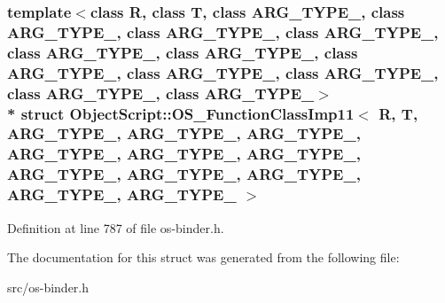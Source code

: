 \subsubsection*{template$<$class R, class T, class A\+R\+G\+\_\+\+T\+Y\+P\+E\+\_, class A\+R\+G\+\_\+\+T\+Y\+P\+E\+\_, class A\+R\+G\+\_\+\+T\+Y\+P\+E\+\_, class A\+R\+G\+\_\+\+T\+Y\+P\+E\+\_, class A\+R\+G\+\_\+\+T\+Y\+P\+E\+\_, class A\+R\+G\+\_\+\+T\+Y\+P\+E\+\_, class A\+R\+G\+\_\+\+T\+Y\+P\+E\+\_, class A\+R\+G\+\_\+\+T\+Y\+P\+E\+\_, class A\+R\+G\+\_\+\+T\+Y\+P\+E\+\_, class A\+R\+G\+\_\+\+T\+Y\+P\+E\+\_, class A\+R\+G\+\_\+\+T\+Y\+P\+E\+\_$>$\\*
struct Object\+Script\+::\+O\+S\+\_\+\+Function\+Class\+Imp11$<$ R, T, A\+R\+G\+\_\+\+T\+Y\+P\+E\+\_, A\+R\+G\+\_\+\+T\+Y\+P\+E\+\_, A\+R\+G\+\_\+\+T\+Y\+P\+E\+\_, A\+R\+G\+\_\+\+T\+Y\+P\+E\+\_, A\+R\+G\+\_\+\+T\+Y\+P\+E\+\_, A\+R\+G\+\_\+\+T\+Y\+P\+E\+\_, A\+R\+G\+\_\+\+T\+Y\+P\+E\+\_, A\+R\+G\+\_\+\+T\+Y\+P\+E\+\_, A\+R\+G\+\_\+\+T\+Y\+P\+E\+\_, A\+R\+G\+\_\+\+T\+Y\+P\+E\+\_, A\+R\+G\+\_\+\+T\+Y\+P\+E\+\_ $>$}



Definition at line 787 of file os-\/binder.\+h.



The documentation for this struct was generated from the following file\+:\begin{DoxyCompactItemize}
\item 
src/os-\/binder.\+h\end{DoxyCompactItemize}
